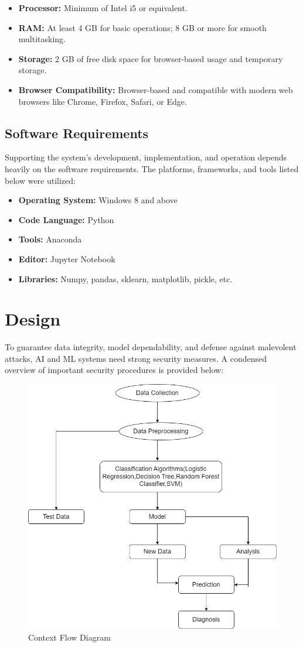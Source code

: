 \begin{itemize}
\item \textbf{Processor:} Minimum of Intel i5 or equivalent.
\item \textbf{RAM:} At least 4 GB for basic operations; 8 GB or more for smooth multitasking.
\item \textbf{Storage:} 2 GB of free disk space for browser-based usage and temporary storage.
\item \textbf{Browser Compatibility:} Browser-based and compatible with modern web browsers like Chrome, Firefox, Safari, or Edge.
\end{itemize}

\subsection{Software Requirements}
Supporting the system's development, implementation, and operation depends heavily on the software requirements. The platforms, frameworks, and tools listed below were utilized:

\begin{itemize}
\item \textbf{Operating System:} Windows 8 and above
\item \textbf{Code Language:} Python
\item \textbf{Tools:} Anaconda
\item \textbf{Editor:} Jupyter Notebook
\item \textbf{Libraries:} Numpy, pandas, sklearn, matplotlib, pickle, etc.
\end{itemize}

\section{Design}
To guarantee data integrity, model dependability, and defense against malevolent attacks, AI and ML systems need strong security measures. A condensed overview of important security procedures is provided below:


\begin{figure}[h]
\centering
\includegraphics[width=0.7\linewidth]{Images/cc.png}
\caption{Context Flow Diagram}
\label{fig:enter-label}
\end{figure}

